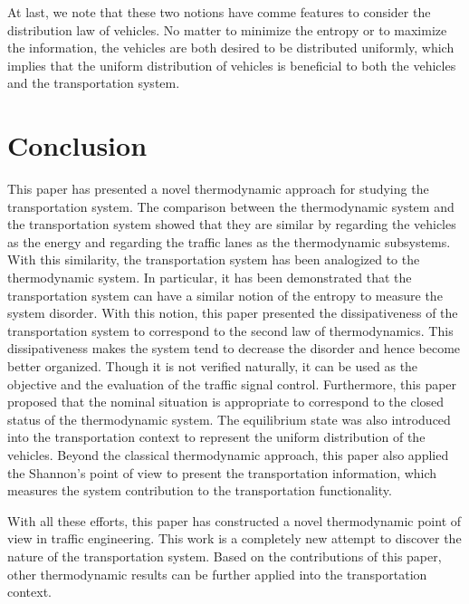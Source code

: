 \documentclass[preprint,authoryear,12pt]{elsarticle}
\begin{document}
At last, we note that these two notions have comme features to
consider the distribution law of vehicles. No matter to minimize the
entropy or to maximize the information, the vehicles are both desired
to be distributed uniformly, which implies that the uniform
distribution of vehicles is beneficial to both the vehicles and the
transportation system.

\section{Conclusion}

This paper has presented a novel thermodynamic approach for studying
the transportation system. The comparison between the thermodynamic
system and the transportation system showed that they are similar by
regarding the vehicles as the energy and regarding the traffic lanes
as the thermodynamic subsystems. With this similarity, the
transportation system has been analogized to the thermodynamic
system. In particular, it has been demonstrated that the
transportation system can have a similar notion of the entropy to
measure the system disorder. With this notion, this paper presented
the dissipativeness of the transportation system to correspond to the
second law of thermodynamics. This dissipativeness makes the system
tend to decrease the disorder and hence become better organized.
Though it is not verified naturally, it can be used as the objective
and the evaluation of the traffic signal control. Furthermore, this
paper proposed that the nominal situation is appropriate to
correspond to the closed status of the thermodynamic system. The
equilibrium state was also introduced into the transportation context
to represent the uniform distribution of the vehicles. Beyond the
classical thermodynamic approach, this paper also applied the
Shannon's point of view to present the transportation information,
which measures the system contribution to the transportation
functionality.

With all these efforts, this paper has constructed a novel
thermodynamic point of view in traffic engineering. This work is a
completely new attempt to discover the nature of the transportation
system. Based on the contributions of this paper, other thermodynamic
results can be further applied into the transportation context.



\end{document}
